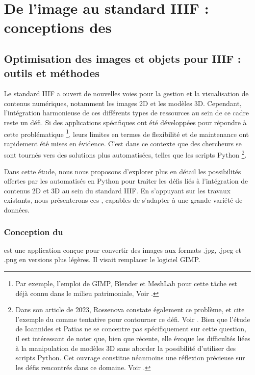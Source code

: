 \part{De l'image au standard IIIF : conceptions des }
\chapter{Optimisation des images et objets pour IIIF : outils et méthodes}
    Le standard IIIF a ouvert de nouvelles voies pour la gestion et la visualisation de contenus numériques, notamment les images 2D et les modèles 3D. Cependant, l'intégration harmonieuse de ces différents types de ressources au sein de ce cadre reste un défi. Si des applications spécifiques ont été développées pour répondre à cette problématique \footnote{Par exemple, l'emploi de GIMP, Blender et MeshLab pour cette tâche est déjà connu dans le milieu patrimoniale, Voir \cite{raemygautschy2023}.}, leurs limites en termes de flexibilité et de maintenance ont rapidement été mises en évidence. C'est dans ce contexte que des chercheurs se sont tournés vers des solutions plus automatisées, telles que les scripts Python \footnote{Dans son article de 2023, Rossenova constate également ce problème, et cite l'exemple du  comme tentative pour contourner ce défi. Voir \cite{rossenova2023iiif}. Bien que l'étude de Ioannides et Patias ne se concentre pas spécifiquement sur cette question, il est intéressant de noter que, bien que récente, elle évoque les difficultés liées à la manipulation de modèles 3D sans aborder la possibilité d'utiliser des scripts Python. Cet ouvrage constitue néanmoins une réflexion précieuse sur les défis rencontrés dans ce domaine. Voir \cite{ioannides_patias_2023}.}.

    Dans cette étude, nous nous proposons d'explorer plus en détail les possibilités offertes par les  automatisés en Python pour traiter les défis liés à l'intégration de contenus 2D et 3D au sein du standard IIIF. En s'appuyant sur les travaux existants, nous présenterons ces , capables de s'adapter à une grande variété de données.
    
    \section{Conception du \cvt}
    \cvt est une application conçue pour convertir des images aux formats .jpg, .jpeg et .png en versions plus légères. Il visait remplacer le logiciel GIMP.
